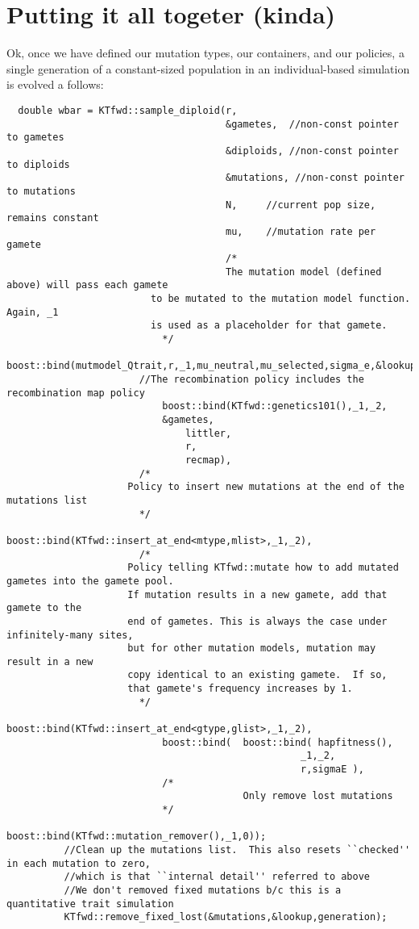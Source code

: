 \documentclass{article}
\begin{document}
\section{Putting it all togeter (kinda)}
Ok, once we have defined our mutation types, our containers, and our policies, a single generation of a constant-sized population in an individual-based simulation is evolved a follows:
\begin{lstlisting}
  double wbar = KTfwd::sample_diploid(r,
                                      &gametes,  //non-const pointer to gametes
                                      &diploids, //non-const pointer to diploids
                                      &mutations, //non-const pointer to mutations
                                      N,     //current pop size, remains constant
                                      mu,    //mutation rate per gamete
                                      /*
                                      The mutation model (defined above) will pass each gamete
      					 to be mutated to the mutation model function.  Again, _1
      					 is used as a placeholder for that gamete.
      				       */
      				       boost::bind(mutmodel_Qtrait,r,_1,mu_neutral,mu_selected,sigma_e,&lookup),
				       //The recombination policy includes the recombination map policy
      				       boost::bind(KTfwd::genetics101(),_1,_2,
						   &gametes,
      						   littler,
      						   r,
      						   recmap),
				       /*
					 Policy to insert new mutations at the end of the mutations list
				       */
      				       boost::bind(KTfwd::insert_at_end<mtype,mlist>,_1,_2),
				       /*
					 Policy telling KTfwd::mutate how to add mutated gametes into the gamete pool.
					 If mutation results in a new gamete, add that gamete to the 
					 end of gametes. This is always the case under infinitely-many sites,
					 but for other mutation models, mutation may result in a new
					 copy identical to an existing gamete.  If so,
					 that gamete's frequency increases by 1.
				       */
      				       boost::bind(KTfwd::insert_at_end<gtype,glist>,_1,_2),
      				       boost::bind(  boost::bind( hapfitness(),
                                                   _1,_2,
                                                   r,sigmaE ),
      				       /*
                                         Only remove lost mutations
      				       */
      				       boost::bind(KTfwd::mutation_remover(),_1,0));
          //Clean up the mutations list.  This also resets ``checked'' in each mutation to zero,
          //which is that ``internal detail'' referred to above
          //We don't removed fixed mutations b/c this is a quantitative trait simulation
      	  KTfwd::remove_fixed_lost(&mutations,&lookup,generation);
\end{lstlisting}
\end{document}
